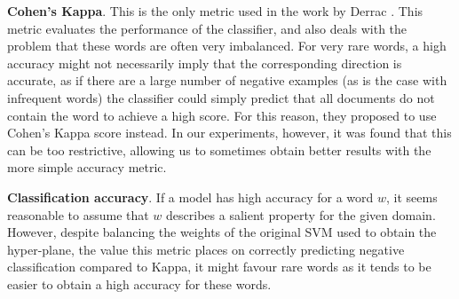 \noindent

\noindent \textbf{Cohen's Kappa}. This is the only metric used in the work by Derrac \cite{Derrac2015}. This metric evaluates the performance of the classifier, and also deals with the problem that these words are often very imbalanced. For very rare words, a high accuracy might not necessarily imply that the corresponding direction is accurate, as if there are a large number of negative examples (as is the case with infrequent words) the classifier could simply predict that all documents do not contain the word to achieve a high score. For this reason, they proposed to use Cohen's Kappa score instead. In our experiments, however, it was found that this can be too restrictive, allowing us to sometimes obtain better results with the more simple accuracy metric.\smallskip %


 \textbf{Classification accuracy}. If a model has high accuracy for a word $w$, it seems reasonable to assume that $w$ describes a salient property for the given domain. However, despite balancing the weights of the original SVM used to obtain the hyper-plane, the value this metric places on correctly predicting negative classification  compared to Kappa, it might favour rare words as it tends to be easier to obtain a high accuracy for these words.%
\smallskip


